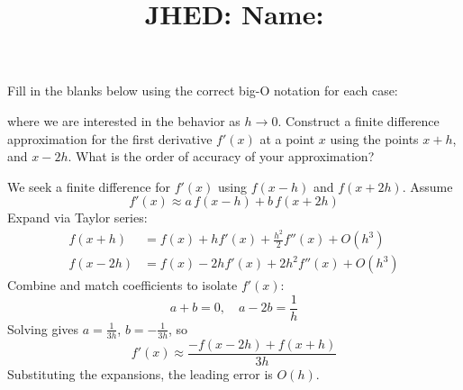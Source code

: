 \documentclass[reqno, answers]{exam}
\title{\normalsize{
  JHED: \underline{\hspace{4cm}} \hspace{1em} Name: \underline{\hspace{9cm}}}
   }
\author{}
\date{}
\begin{document}
\maketitle
\vspace{-2cm} %

\begin{questions}
  \question[4] 
  Fill in the blanks below using the correct big-O notation for each case:\vspace{1.5ex}
  where we are interested in the behavior as $h \to 0$.
  \question[8]
  Construct a finite difference approximation for the first derivative $f'(x)$ at a point $x$ using the points $x + h$, and $x - 2h$. What is the order of accuracy of your approximation?

  \begin{solution}
    We seek a finite difference for $f'(x)$ using $f(x-h)$ and $f(x+2h)$. Assume
    \[
      f'(x) \approx a\, f(x-h) + b\, f(x+2h)
    \]
    Expand via Taylor series:
    \begin{align*}
      f(x+h) &= f(x) + h f'(x) + \frac{h^2}{2} f''(x) + O(h^3) \\
      f(x-2h) &= f(x) - 2h f'(x) + 2h^2 f''(x) + O(h^3)
    \end{align*}
    Combine and match coefficients to isolate $f'(x)$:
    \[
      a + b = 0, \quad a - 2b = \frac{1}{h}
    \]
    Solving gives $a = \frac{1}{3h}$, $b = -\frac{1}{3h}$, so
    \[
      f'(x) \approx \frac{-f(x-2h) + f(x+h)}{3h}
    \]
    Substituting the expansions, the leading error is $O(h)$.


\end{solution}
\end{questions}
\end{document}
